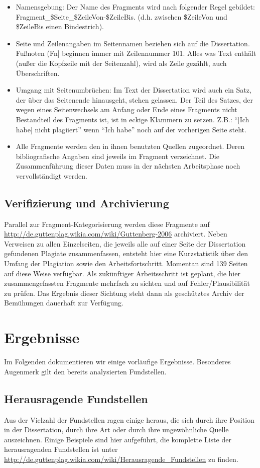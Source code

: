 \documentclass[ngerman,final,fontsize=12pt,paper=a4,twoside,BCOR=8mm,draft=false]{scrartcl}
\begin{document}
\begin{itemize}
\item Namensgebung: Der Name des Fragments wird nach folgender Regel
  gebildet: Fragment\_\$Seite\_\$ZeileVon-\$ZeileBis. (d.h. zwischen
  \$ZeileVon und \$ZeileBis einen Bindestrich).
\item Seite und Zeilenangaben im Seitennamen beziehen sich auf die Dissertation. Fußnoten (Fn] beginnen immer mit Zeilennummer 101. Alles was Text enthält (außer die Kopfzeile mit der Seitenzahl), wird als Zeile gezählt, auch Überschriften.
\item Umgang mit Seitenumbrüchen: Im Text der Dissertation wird auch ein Satz, der über das Seitenende hinausgeht, stehen gelassen. Der Teil des Satzes, der wegen eines Seitenwechsels am Anfang oder Ende eines Fragments nicht Bestandteil des Fragments ist, ist in eckige Klammern zu setzen. Z.B.: "`[Ich habe] nicht plagiiert"' wenn "`Ich habe"' noch auf der vorherigen Seite steht.
\item Alle Fragmente werden den in ihnen benutzten Quellen zugeordnet. Deren bibliografische Angaben sind jeweils im Fragment verzeichnet. Die Zusammenführung dieser Daten muss in der nächsten Arbeitsphase noch vervollständigt werden.
\end{itemize}

\subsection{Verifizierung und Archivierung}
Parallel zur Fragment-Kategorisierung werden diese Fragmente auf \url{http://de.guttenplag.wikia.com/wiki/Guttenberg-2006} archiviert. Neben Verweisen zu allen Einzelseiten, die jeweils alle auf einer Seite der Dissertation gefundenen Plagiate zusammenfassen, entsteht hier eine Kurzstatistik über den Umfang der Plagiation sowie den Arbeitsfortschritt. Momentan sind 139 Seiten auf diese Weise verfügbar. 
Als zukünftiger Arbeitsschritt ist geplant, die hier zusammengefassten Fragmente mehrfach zu sichten und auf Fehler/Plausibilität zu prüfen. Das Ergebnis dieser Sichtung steht dann als geschütztes Archiv der Bemühungen dauerhaft zur Verfügung.

\section{Ergebnisse}
Im Folgenden dokumentieren wir einige vorläufige Ergebnisse. Besonderes Augenmerk gilt den bereits analysierten Fundstellen.

\subsection{Herausragende Fundstellen}
Aus der Vielzahl der Fundstellen ragen einige heraus, die sich durch ihre Position in der Dissertation, durch ihre Art oder durch ihre ungewöhnliche Quelle auszeichnen. Einige Beispiele sind hier aufgeführt, die komplette Liste der herausragenden Fundstellen ist unter \url{http://de.guttenplag.wikia.com/wiki/Herausragende\_Fundstellen} zu finden. 
\end{document}
